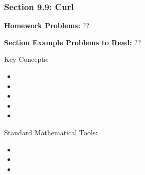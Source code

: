 %
% 

\begin{frame}
\frametitle{\Large {\color[rgb]{0.02,0.20,1.0} Section 9.9: Curl}}
\scriptsize

\vspace{0.2cm}
{\bf Homework Problems:} \quad ??

\vspace{0.2cm}

{\bf Section Example Problems to Read:} \quad ??

\vspace{0.2cm}

\begin{block}{Key Concepts:}
\begin{itemize}
	\item[...] 
	\item[...] 
	\item[...] 
	\item[...] 
	\item[...] 
\end{itemize}
\end{block}

\begin{block}{Standard Mathematical Tools:}
\begin{itemize}
	\item[...] 
	\item[...] 
	\item[...] 
\end{itemize}
\end{block}

\end{frame}

